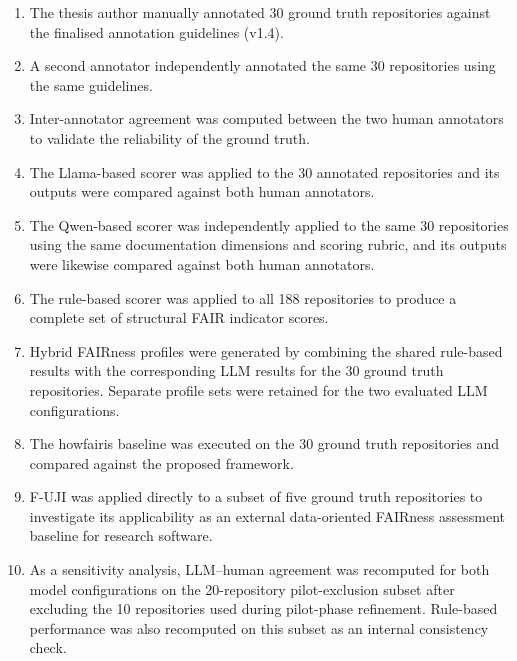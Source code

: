 \begin{enumerate}

\item The thesis author manually annotated 30 ground truth
repositories against the finalised annotation guidelines (v1.4).

\item A second annotator independently annotated the same 30
repositories using the same guidelines.

\item Inter-annotator agreement was computed between the two
human annotators to validate the reliability of the ground truth.

\item The Llama-based scorer was applied to the 30 annotated
repositories and its outputs were compared against both human
annotators.

\item The Qwen-based scorer was independently applied to the same
30 repositories using the same documentation dimensions and scoring
rubric, and its outputs were likewise compared against both human
annotators.

\item The rule-based scorer was applied to all 188 repositories
to produce a complete set of structural FAIR indicator scores.

\item Hybrid FAIRness profiles were generated by combining the
shared rule-based results with the corresponding LLM results for
the 30 ground truth repositories. Separate profile sets were retained
for the two evaluated LLM configurations.

\item The howfairis baseline was executed on the 30 ground truth
repositories and compared against the proposed framework.

\item F-UJI was applied directly to a subset of five ground truth
repositories to investigate its applicability as an external
data-oriented FAIRness assessment baseline for research software.

\item As a sensitivity analysis, LLM--human agreement was recomputed
for both model configurations on the 20-repository pilot-exclusion
subset after excluding the 10 repositories used during pilot-phase
refinement. Rule-based performance was also recomputed on this subset
as an internal consistency check.

\end{enumerate}

